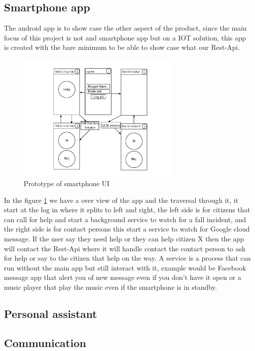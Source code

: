 \subsection{Smartphone app}
The android app is to show case the other aspect of the product, since the main focus of this project is not and smartphone app but on a IOT solution, this app is created with the bare minimum to be able to show case what our Rest-Api.

\begin{figure}[H]
    \centering
    \includegraphics[width=0.7\textwidth]{Figures/MobilUI.png}
    \caption{Prototype of smartphone UI}
    \label{fig:mobilUI}
\end{figure}

In the figure \ref{fig:mobilUI} we have a over view of the app and the traversal through it, it start at the log in where it splits to left and right, the left side is for citizens that can call for help and start a background service to watch for a fall incident, and the right side is for contact persons this start a service to watch for Google cloud message. If the user say they need help or they can help citizen X then the app will contact the Rest-Api where it will handle contact the contact person to ask for help or say to the citizen that help on the way.
A service is a process that can run without the main app but still interact with it, example would be Facebook message app that alert you of new message even if you don't have it open or a music player that play the music even if the smartphone is in standby.

\subsection{Personal assistant}

\subsection{Communication}
